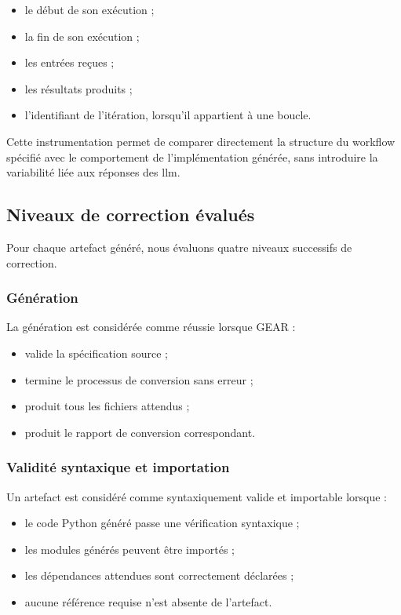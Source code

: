 \begin{itemize}
    \item le début de son exécution ;
    \item la fin de son exécution ;
    \item les entrées reçues ;
    \item les résultats produits ;
    \item l'identifiant de l'itération, lorsqu'il appartient à une
    boucle.
\end{itemize}

Cette instrumentation permet de comparer directement la structure du
workflow spécifié avec le comportement de l'implémentation générée,
sans introduire la variabilité liée aux réponses des \gls{llm}.


\subsection{Niveaux de correction évalués}
\label{subsec:niveaux-correction}

Pour chaque artefact généré, nous évaluons quatre niveaux successifs de
correction.


\subsubsection{Génération}

La génération est considérée comme réussie lorsque GEAR :

\begin{itemize}
    \item valide la spécification source ;
    \item termine le processus de conversion sans erreur ;
    \item produit tous les fichiers attendus ;
    \item produit le rapport de conversion correspondant.
\end{itemize}


\subsubsection{Validité syntaxique et importation}

Un artefact est considéré comme syntaxiquement valide et importable
lorsque :

\begin{itemize}
    \item le code Python généré passe une vérification syntaxique ;
    \item les modules générés peuvent être importés ;
    \item les dépendances attendues sont correctement déclarées ;
    \item aucune référence requise n'est absente de l'artefact.
\end{itemize}


